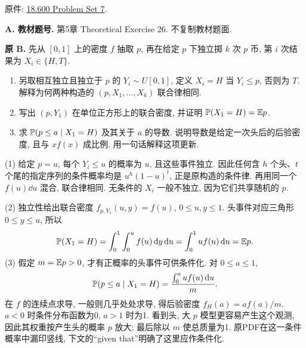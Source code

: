 原件: \href{https://ocw.mit.edu/courses/18-600-probability-and-random-variables-fall-2019/resources/mit18_600f19_pset7/}{18.600 Problem Set 7}.
\par\noindent\textbf{A. 教材题号.}\label{part:P7.A} 第5章 Theoretical Exercise 26. 不复制教材题面.

\begin{exercise}\label{ex:P7.B}
\textbf{原 B.} 先从 $[0,1]$ 上的密度 $f$ 抽取 $p$, 再在给定 $p$ 下独立掷 $k$ 次 $p$ 币, 第 $i$ 次结果为 $X_i\in\{H,T\}$.
\begin{enumerate}[label=\arabic*.]
\item\label{part:P7.B.1} 另取相互独立且独立于 $p$ 的 $Y_i\sim U[0,1]$, 定义 $X_i=H$ 当 $Y_i\le p$, 否则为 $T$. 解释为何两种构造的 $(p,X_1,\ldots,X_k)$ 联合律相同.
\item\label{part:P7.B.2} 写出 $(p,Y_1)$ 在单位正方形上的联合密度, 并证明 $\mathbb P(X_1=H)=\mathbb E p$.
\item\label{part:P7.B.3} 求 $\mathbb P(p\le a\mid X_1=H)$ 及其关于 $a$ 的导数. 说明导数是给定一次头后的后验密度, 且与 $xf(x)$ 成比例. 用一句话解释这项更新.
\end{enumerate}
\end{exercise}
\begin{solution}\label{sol:P7.B}
(1) 给定 $p=u$, 每个 $Y_i\le u$ 的概率为 $u$, 且这些事件独立. 因此任何含 $h$ 个头、$t$ 个尾的指定序列的条件概率均是 $u^h(1-u)^t$, 正是原构造的条件律. 再用同一个 $f(u)\dd u$ 混合, 联合律相同. 无条件的 $X_i$ 一般不独立, 因为它们共享随机的 $p$.

(2) 独立性给出联合密度 $f_{p,Y_1}(u,y)=f(u)$, $0\le u,y\le1$. 头事件对应三角形 $0\le y\le u$, 所以
\[
 \mathbb P(X_1=H)=\int_0^1\int_0^u f(u)\,\mathrm d y\,\mathrm d u
 =\int_0^1u f(u)\,\mathrm d u=\mathbb E p.
\]
(3) 假定 $m=\mathbb E p>0$, 才有正概率的头事件可供条件化. 对 $0\le a\le1$,
\[
 \mathbb P(p\le a\mid X_1=H)=\frac{\int_0^a u f(u)\,\mathrm d u}{m}.
\]
在 $f$ 的连续点求导, 一般则几乎处处求导, 得后验密度 $f_H(a)=af(a)/m$. $a<0$ 时条件分布函数为0, $a>1$ 时为1. 看到头, 大 $p$ 模型更容易产生这个观测, 因此其权重按产生头的概率 $p$ 放大; 最后除以 $m$ 使总质量为1. 原PDF在这一条件概率中漏印竖线, 下文的“given that”明确了这里应作条件化.
\end{solution}

